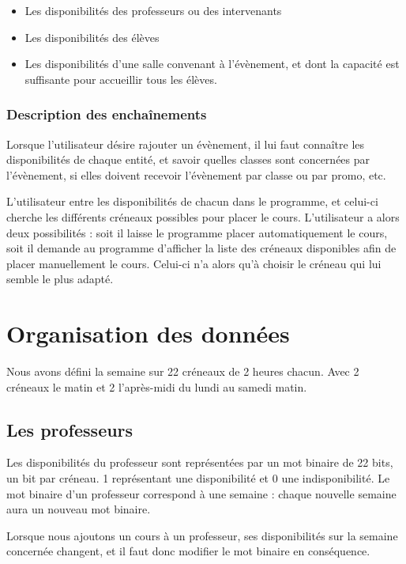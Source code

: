 \documentclass[12pt,a4paper,french]{article}
\newcounter{subsubsubsection}
\begin{document}
\begin{itemize}
\item Les disponibilités des professeurs ou des intervenants
\item Les disponibilités des élèves
\item Les disponibilités d'une salle convenant à l'évènement, et dont la capacité est suffisante pour accueillir tous les élèves.
\end{itemize}
                
\subsubsection{Description des enchaînements}        
Lorsque l'utilisateur désire rajouter un évènement, il lui faut connaître les disponibilités de chaque entité, et savoir quelles classes sont concernées par l'évènement, si elles doivent recevoir l'évènement par classe ou par promo, etc.

L'utilisateur entre les disponibilités de chacun dans le programme, et celui-ci cherche les différents créneaux possibles pour placer le cours. L'utilisateur a alors deux possibilités : soit il laisse le programme placer automatiquement le cours, soit il demande au programme d'afficher la liste des créneaux disponibles afin de placer manuellement le cours. Celui-ci n'a alors qu'à choisir le créneau qui lui semble le plus adapté.

\newpage
\section{Organisation des données}
Nous avons défini la semaine sur 22 créneaux de 2 heures chacun. Avec 2 créneaux le matin et 2 l'après-midi du lundi au samedi matin.

\subsection{Les professeurs}
Les disponibilités du professeur sont représentées par un mot binaire de 22 bits, un bit par créneau. 1 représentant une disponibilité et 0 une indisponibilité.
Le mot binaire d'un professeur correspond à une semaine : chaque nouvelle semaine aura un nouveau mot binaire.

Lorsque nous ajoutons un cours à un professeur, ses disponibilités sur la semaine concernée changent, et il faut donc modifier le mot binaire en conséquence.
\end{document}
